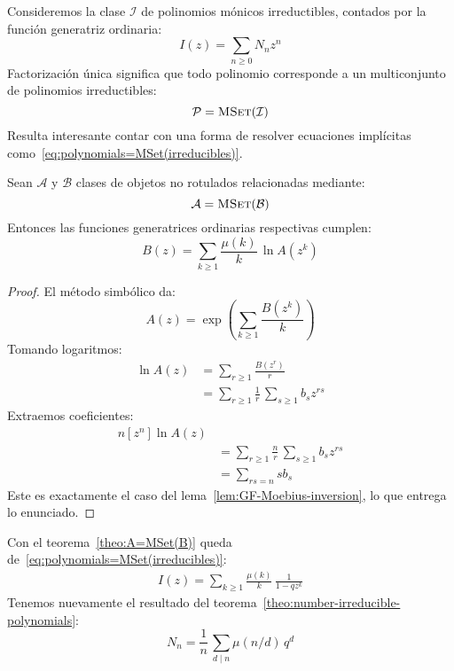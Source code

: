   Consideremos la clase \(\mathcal{I}\)
  de polinomios mónicos irreductibles,
  contados por la función generatriz ordinaria:
  \begin{equation*}
    I(z)
      = \sum_{n \ge 0} N_n z^n
  \end{equation*}
  Factorización única significa que todo polinomio
  corresponde a un multiconjunto de polinomios irreductibles:
  \begin{equation}
    \label{eq:polynomials=MSet(irreducibles)}
    \mathcal{P}
      = \operatorname{\textsc{MSet}}(\mathcal{I})
  \end{equation}
  Resulta interesante
  contar con una forma de resolver ecuaciones implícitas
  como~\eqref{eq:polynomials=MSet(irreducibles)}.
  \begin{theorem}
    \label{theo:A=MSet(B)}
    Sean \(\mathcal{A}\) y \(\mathcal{B}\)
    clases de objetos no rotulados
    relacionadas mediante:
    \begin{equation*}
      \mathcal{A}
	= \operatorname{\textsc{MSet}}(\mathcal{B})
    \end{equation*}
    Entonces las funciones generatrices ordinarias
    respectivas cumplen:
    \begin{equation}
      \label{eq:A=MSet(B)-->B}
      B(z)
	= \sum_{k \ge 1} \frac{\mu(k)}{k} \, \ln A(z^k)
    \end{equation}
  \end{theorem}
  \begin{proof}
    El método simbólico da:
    \begin{equation*}
      A(z)
	= \exp \left( \sum_{k \ge 1} \frac{B(z^k)}{k} \right)
    \end{equation*}
    Tomando logaritmos:
    \begin{align*}
      \ln A(z)
	&= \sum_{r \ge 1} \frac{B(z^r)}{r} \\
	&= \sum_{r \ge 1} \frac{1}{r} \, \sum_{s \ge 1} b_s z^{r s}
    \end{align*}
    Extraemos coeficientes:
    \begin{align*}
      n \left[ z^n \right] \ln A(z) \\
	&= \sum_{r \ge 1} \frac{n}{r} \, \sum_{s \ge 1} b_s z^{r s} \\
	&= \sum_{r s = n} s b_s
    \end{align*}
    Este es exactamente el caso
    del lema~\ref{lem:GF-Moebius-inversion},
    lo que entrega lo enunciado.
  \end{proof}

  Con el teorema~\ref{theo:A=MSet(B)}
  queda de~\eqref{eq:polynomials=MSet(irreducibles)}:
  \begin{align*}
    I(z)
      = \sum_{k \ge 1} \frac{\mu(k)}{k} \, \frac{1}{1 - q z^k}
  \end{align*}
  Tenemos nuevamente el resultado
  del teorema~\ref{theo:number-irreducible-polynomials}:
  \begin{equation*}
    N_n
      = \frac{1}{n} \, \sum_{d \mid n} \mu(n / d)  \, q^d
  \end{equation*}

